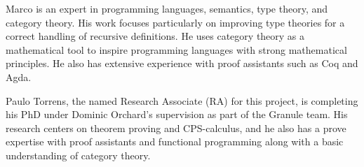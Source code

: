\documentclass[11pt]{article}
\begin{document}
Marco is an expert in programming languages, semantics, type theory, and
category theory. His work focuses particularly on improving type theories for a
correct handling of recursive definitions. He uses category theory as a
mathematical tool to inspire programming languages with strong mathematical
principles. He also has extensive experience with proof assistants such as Coq
and Agda.

Paulo Torrens, the named Research Associate (RA) for this project, is completing
his PhD under Dominic Orchard's supervision as part of the Granule team. His research centers
on theorem proving and CPS-calculus, and he also has a prove expertise with
proof assistants and functional programming along with a basic understanding of
category theory.



\end{document}
